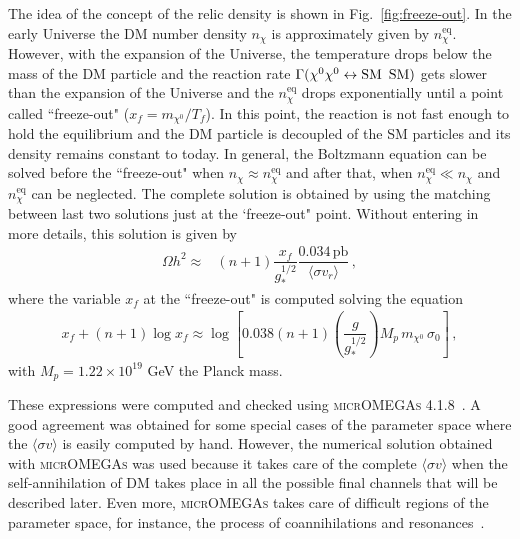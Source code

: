 The idea of the concept of the relic density is shown in Fig.~\ref{fig:freeze-out}. In the early Universe the DM number density $n_{\chi}$ is approximately given by $n_{\chi}^{\text{eq}}$.
However, with the expansion of the Universe, the temperature drops below the mass of the DM particle and the reaction rate $\Gamma(\chi^0\chi^0\leftrightarrow \text{SM\, SM})$ gets slower than the expansion of the Universe and the $n_{\chi}^{\text{eq}}$ drops exponentially until a point called ``freeze-out" ($x_f=m_{\chi^0}/T_f$).
In this point, the reaction is not fast enough to hold the equilibrium and the DM particle is decoupled of the SM particles and its density remains constant to today.  
In general, the Boltzmann equation can be solved  before the ``freeze-out" when $n_{\chi}\approx n_{\chi}^{\text{eq}}$ and  after that,  when $n_{\chi}^{\text{eq}} \ll n_{\chi}$ and $n_{\chi}^{\text{eq}}$ can be neglected.
The complete solution is obtained by using the matching between last two solutions just at the `freeze-out" point.
Without entering in more details, this solution is given by~\cite{D'Eramo:2007ga}
%
\begin{align}
\Omega h^2  \approx & (n+1)\dfrac{x_f}{g_*^{1/2}}\dfrac{0.034\, \text{pb}}{\langle \sigma v_r\rangle} \,,
\end{align} 
where the variable $x_f$ at the ``freeze-out" is computed solving the equation
\begin{align}
x_f+(n+1)\log x_f \approx \log\left[0.038\left(n+1\right)\left(\dfrac{g}{g_*^{1/2}}\right)M_{p}\,m_{\chi^0}\,\sigma_{0}\right]\,,
\end{align} 
with $M_{p}=1.22 \times 10^{19}$ GeV the Planck mass.

These expressions were computed and checked using \textsc{micrOMEGAs 4.1.8}~\cite{Belanger:2014vza}. A good agreement was obtained for some special cases of the parameter space where the $\langle \sigma v \rangle$ is easily computed by hand. However, the numerical solution obtained with \textsc{micrOMEGAs} was used because it takes care of the complete $\langle \sigma v \rangle$ when the self-annihilation of DM takes place in all the possible final channels that will be described later. Even more,  \textsc{micrOMEGAs} takes care of difficult regions of the parameter space, for instance, the process of coannihilations and resonances~\cite{Griest:1990kh}. 












